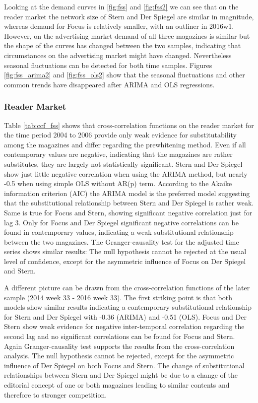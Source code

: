 \documentclass[10pt,a4paper]{scrreprt}
\begin{document}
Looking at the demand curves in \ref{fig:fss} and \ref{fig:fss2} we can see that on the reader market the network size of Stern and Der Spiegel are similar in magnitude, whereas demand for Focus is relatively smaller, with an outliner in 2016w1. However, on the advertising market demand of all three magazines is similar but the shape of the curves has changed between the two samples, indicating that circumstances on the advertising market might have changed. Nevertheless seasonal fluctuations can be detected for both time samples. Figures \ref{fig:fss_arima2} and \ref{fig:fss_ols2} show that the seasonal fluctuations and other common trends have disappeared after ARIMA and OLS regressions.  
\subsubsection{Reader Market}
Table \ref{tab:ccf_fss} shows that cross-correlation functions on the reader market for the time period 2004 to 2006 provide only weak evidence for substitutability among the magazines and differ regarding the prewhitening method. Even if all contemporary values are negative, indicating that the magazines are rather substitutes, they are largely not statistically significant. Stern and Der Spiegel show just little negative correlation when using the ARIMA method, but nearly -0.5 when using simple OLS without AR(p) term. According to the Akaike information criterion (AIC) the ARIMA model is the preferred model suggesting that the substitutional relationship between Stern and Der Spiegel is rather weak. Same is true for Focus and Stern, showing significant negative correlation just for lag 3. Only for Focus and Der Spiegel significant negative correlations can be found in contemporary values, indicating a weak substitutional relationship between the two magazines. The Granger-causality test for the adjusted time series shows similar results: The null hypothesis cannot be rejected at the usual level of confidence, except for the asymmetric influence of Focus on Der Spiegel and Stern. 
\par\medskip
 A different picture can be drawn from the cross-correlation functions of the later sample (2014 week 33 - 2016 week 33). The first striking point is that both models show similar results indicating a contemporary substitutional relationship for Stern and Der Spiegel with -0.36 (ARIMA) and -0.51 (OLS). Focus and Der Stern show weak evidence for negative inter-temporal correlation regarding the second lag and no significant correlations can be found for Focus and Stern. Again Granger-causality test supports the results from the cross-correlation analysis. The null hypothesis cannot be rejected, except for the asymmetric influence of Der Spiegel on both Focus and Stern. The change of substitutional relationships between Stern and Der Spiegel might be due to a change of the editorial concept of one or both magazines leading to similar contents and therefore to stronger competition. 
\end{document}
